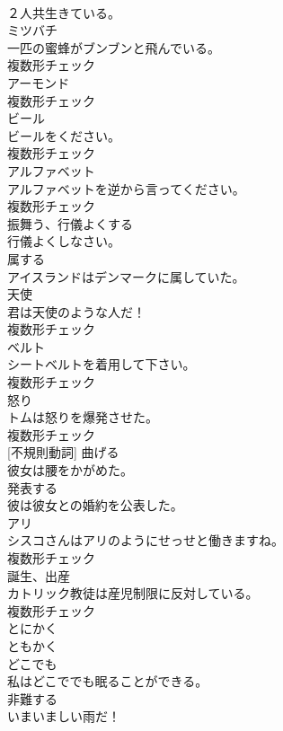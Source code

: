 \documentclass[8pt]{extreport}
\begin{document}
\begin{CJK}{UTF8}{min}
\\	２人共生きている。	
\\	[名詞]	ミツバチ	
\\	一匹の蜜蜂がブンブンと飛んでいる。	
\\	複数形チェック
\\	[名詞]	アーモンド	
\\	複数形チェック
\\	[名詞]	ビール	
\\	ビールをください。	
\\	複数形チェック
\\	[名詞]	アルファベット	
\\	アルファベットを逆から言ってください。	
\\	複数形チェック
\\	[動詞]	振舞う、行儀よくする	
\\	行儀よくしなさい。	
\\	[動詞]	属する	
\\	アイスランドはデンマークに属していた。	
\\	[名詞]	天使	
\\	君は天使のような人だ！	
\\	複数形チェック
\\	[名詞]	ベルト	
\\	シートベルトを着用して下さい。	
\\	複数形チェック
\\	[名詞]	怒り	
\\	トムは怒りを爆発させた。	
\\	複数形チェック
\\	[動詞] [不規則動詞]	曲げる	
\\	彼女は腰をかがめた。	
\\	[動詞]	発表する	
\\	彼は彼女との婚約を公表した。	
\\	[名詞]	アリ	
\\	シスコさんはアリのようにせっせと働きますね。	
\\	複数形チェック
\\	[名詞]	誕生、出産	
\\	カトリック教徒は産児制限に反対している。	
\\	複数形チェック
\\	[副詞]	とにかく	
\\	ともかく	
\\	[副詞]	どこでも	
\\	私はどこででも眠ることができる。	
\\	[動詞]	非難する	
\\	いまいましい雨だ！	

\end{CJK}
\end{document}
